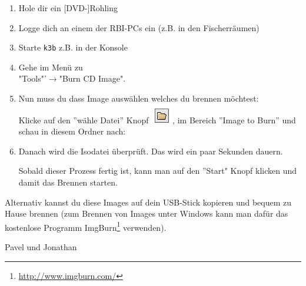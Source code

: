 \begin{enumerate}
\item Hole dir ein [DVD-]Rohling
\item Logge dich an einem der RBI-PCs ein (z.B. in den Fischerräumen)
\item Starte \texttt{k3b} z.B. in der Konsole
\item Gehe im Menü zu\\"Tools"'$\to$"Burn CD Image".

\item Nun muss du dass Image auswählen welches du brennen möchtest:\\
Klicke auf den ''wähle Datei'' Knopf \includegraphics[scale=0.5]{bitmaps/gelbe_ordner}, im Bereich ''Image to Burn'' und schau in diesem Ordner nach:

\begin{center}
\end{center}
\item Danach wird die Isodatei überprüft. Das wird ein paar Sekunden dauern.

	Sobald dieser Prozess fertig ist, kann man auf den ''Start" Knopf klicken und damit das Brennen starten.

\end{enumerate}

Alternativ kannst du diese Images auf dein USB-Stick kopieren und bequem zu Hause brennen (zum Brennen von Images unter Windows kann man dafür das kostenlose Programm ImgBurn\footnote{\url{http://www.imgburn.com/}} verwenden).

\begin{flushright}Pavel und Jonathan \end{flushright}
